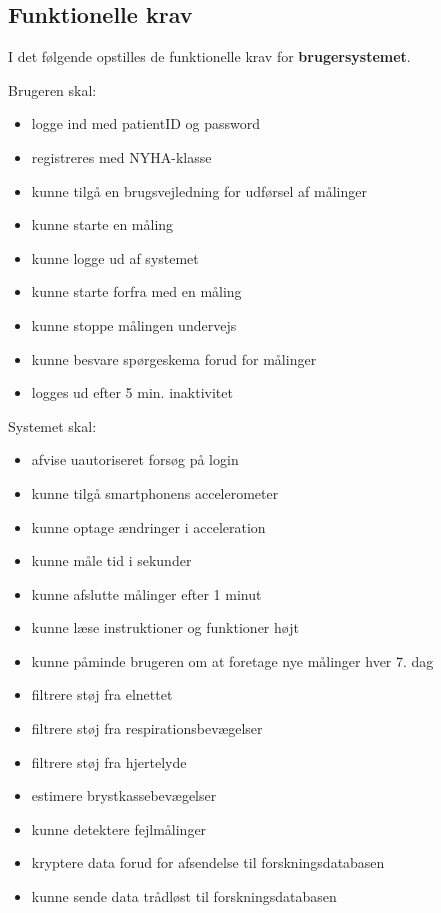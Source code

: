 \subsection{Funktionelle krav}
I det følgende opstilles de funktionelle krav for \textbf{brugersystemet}.

Brugeren skal:
\begin{itemize}
    \item logge ind med patientID og password
    \item registreres med NYHA-klasse
    \item kunne tilgå en brugsvejledning for udførsel af målinger
    \item kunne starte en måling
    \item kunne logge ud af systemet
    \item kunne starte forfra med en måling
    \item kunne stoppe målingen undervejs 
    \item kunne besvare spørgeskema forud for målinger
    \item logges ud efter 5 min. inaktivitet
\end{itemize}
Systemet skal:
\begin{itemize}
    \item afvise uautoriseret forsøg på login
    \item kunne tilgå smartphonens accelerometer
    \item kunne optage ændringer i acceleration
    \item kunne måle tid i sekunder
    \item kunne afslutte målinger efter 1 minut
    \item kunne læse instruktioner og funktioner højt
    \item kunne påminde brugeren om at foretage nye målinger hver 7. dag 
    \item filtrere støj fra elnettet
    \item filtrere støj fra respirationsbevægelser
    \item filtrere støj fra hjertelyde
    \item estimere brystkassebevægelser
    \item kunne detektere fejlmålinger
    \item kryptere data forud for afsendelse til forskningsdatabasen
    \item kunne sende data trådløst til forskningsdatabasen
\end{itemize}

